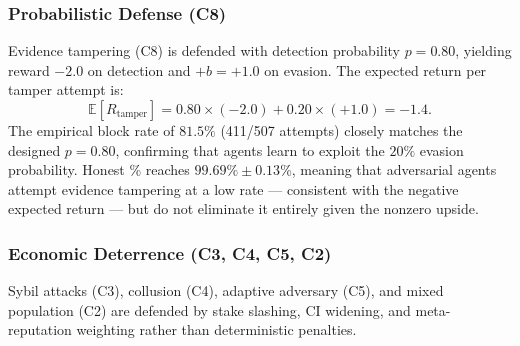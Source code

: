 \subsubsection{Probabilistic Defense (C8)}

Evidence tampering (C8) is defended with detection probability $p = 0.80$,
yielding reward $-2.0$ on detection and $+b = +1.0$ on evasion.  The
expected return per tamper attempt is:
\begin{equation}
  \mathbb{E}[R_{\text{tamper}}] = 0.80 \times (-2.0) + 0.20 \times (+1.0) = -1.4.
  \label{eq:tamper_ev}
\end{equation}
The empirical block rate of $81.5\%$ (411/507 attempts) closely matches the
designed $p=0.80$, confirming that agents learn to exploit the $20\%$
evasion probability.  Honest \% reaches $99.69\% \pm 0.13\%$, meaning that
adversarial agents attempt evidence tampering at a low rate — consistent
with the negative expected return — but do not eliminate it entirely given
the nonzero upside.

\subsubsection{Economic Deterrence (C3, C4, C5, C2)}

Sybil attacks (C3), collusion (C4), adaptive adversary (C5), and mixed
population (C2) are defended by stake slashing, CI widening, and
meta-reputation weighting rather than deterministic penalties.

